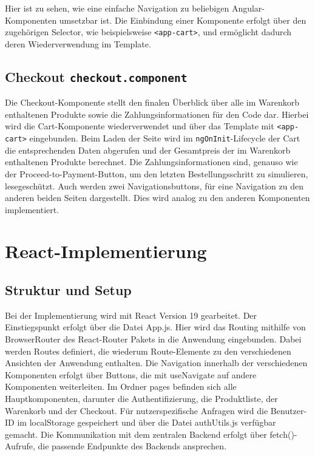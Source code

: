 \documentclass[oneside]{ausarbeitung}
\begin{document}
Hier ist zu sehen, wie eine einfache Navigation zu beliebigen Angular-Komponenten umsetzbar ist. Die Einbindung einer Komponente erfolgt über den zugehörigen Selector, wie beispielsweise \texttt{<app-cart>}, und ermöglicht dadurch deren Wiederverwendung im Template.

\subsection{Checkout \texttt{checkout.component}}

Die Checkout-Komponente stellt den finalen Überblick über alle im Warenkorb enthaltenen Produkte sowie die Zahlungsinformationen für den Code dar. Hierbei wird die Cart-Komponente wiederverwendet und über das Template mit \texttt{<app-cart>} eingebunden.
Beim Laden der Seite wird im \texttt{ngOnInit}-Lifecycle der Cart die entsprechenden Daten abgerufen und der Gesamtpreis der im Warenkorb enthaltenen Produkte berechnet. Die Zahlungsinformationen sind, genauso wie der Proceed-to-Payment-Button, um den letzten Bestellungsschritt zu simulieren, lesegeschützt. Auch werden zwei Navigationsbuttons, für eine Navigation zu den anderen beiden Seiten dargestellt. Dies wird analog zu den anderen Komponenten implementiert.

\section{React-Implementierung}
\subsection{Struktur und Setup}

Bei der Implementierung wird mit React Version 19 gearbeitet. Der Einstiegspunkt erfolgt über die Datei App.js. Hier wird das Routing mithilfe von BrowserRouter des React-Router Pakets in die Anwendung eingebunden. Dabei werden Routes definiert, die wiederum Route-Elemente zu den verschiedenen Ansichten der Anwendung enthalten. Die Navigation innerhalb der verschiedenen Komponenten erfolgt über Buttons, die mit useNavigate auf andere Komponenten weiterleiten. Im Ordner pages befinden sich alle Hauptkomponenten, darunter die Authentifizierung, die Produktliste, der Warenkorb und der Checkout. Für nutzerspezifische Anfragen wird die Benutzer-ID im localStorage gespeichert und über die Datei authUtils.js verfügbar gemacht. Die Kommunikation mit dem zentralen Backend erfolgt über fetch()-Aufrufe, die passende Endpunkte des Backends ansprechen.
\end{document}
